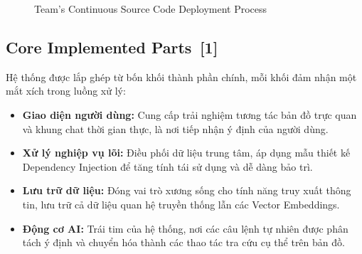 \documentclass[12pt, a4paper]{article}
\begin{document}
\begin{figure}[H]
    \centering
    \caption{Team's Continuous Source Code Deployment Process}
    \label{fig:impl_workflow}
\end{figure}

\subsection[Core Implemented Parts]{Core Implemented Parts \,{\normalfont\small\textcolor{cyan!70!black}{[1]}}}
Hệ thống được lắp ghép từ bốn khối thành phần chính, mỗi khối đảm nhận một mắt xích trong luồng xử lý:
\begin{itemize}
    \item \textbf{Giao diện người dùng:} Cung cấp trải nghiệm tương tác bản đồ trực quan và khung chat thời gian thực, là nơi tiếp nhận ý định của người dùng.
    \item \textbf{Xử lý nghiệp vụ lõi:} Điều phối dữ liệu trung tâm, áp dụng mẫu thiết kế Dependency Injection để tăng tính tái sử dụng và dễ dàng bảo trì.
    \item \textbf{Lưu trữ dữ liệu:} Đóng vai trò xương sống cho tính năng truy xuất thông tin, lưu trữ cả dữ liệu quan hệ truyền thống lẫn các Vector Embeddings.
    \item \textbf{Động cơ AI:} Trái tim của hệ thống, nơi các câu lệnh tự nhiên được phân tách ý định và chuyển hóa thành các thao tác tra cứu cụ thể trên bản đồ.
\end{itemize}
\end{document}
